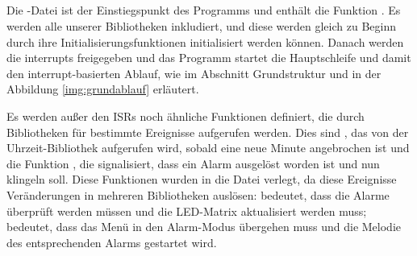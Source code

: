 \subsection{}
Die -Datei ist der Einstiegspunkt des Programms und enthält die Funktion . Es werden alle unserer Bibliotheken inkludiert, und diese werden gleich zu Beginn durch ihre Initialisierungsfunktionen initialisiert werden können. Danach werden die interrupts freigegeben und das Programm startet die Hauptschleife und damit den interrupt-basierten Ablauf, wie im Abschnitt Grundstruktur und in der Abbildung \ref{img:grundablauf} erläutert.
\newline


Es werden außer den ISRs noch ähnliche Funktionen definiert, die durch Bibliotheken für bestimmte Ereignisse aufgerufen werden. Dies sind , das von der Uhrzeit-Bibliothek aufgerufen wird, sobald eine neue Minute angebrochen ist und die Funktion , die signalisiert, dass ein Alarm ausgelöst worden ist und nun klingeln soll. Diese Funktionen wurden in die  Datei verlegt, da diese Ereignisse Veränderungen in mehreren Bibliotheken auslösen:  bedeutet, dass die Alarme überprüft werden müssen und die LED-Matrix aktualisiert werden muss;
 bedeutet, dass das Menü in den Alarm-Modus übergehen muss und die Melodie des entsprechenden Alarms gestartet wird.